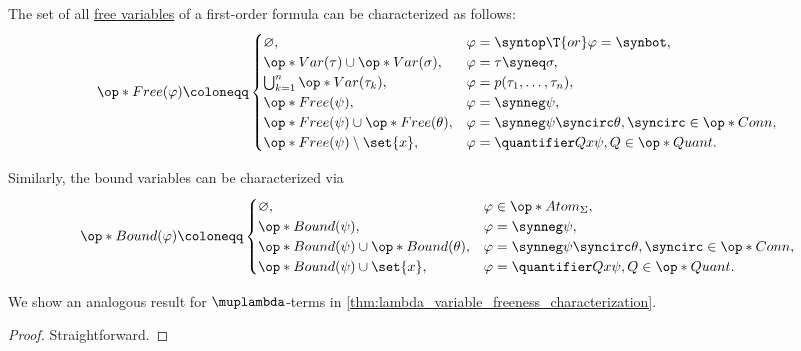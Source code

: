 \begin{proposition}\label{thm:fol_variable_freeness_characterization}
  The set of all \hyperref[def:fol_variable_freeness]{free variables} of a first-order formula can be characterized as follows:
  \begin{equation*}
    \op*{Free}(\varphi) \coloneqq \begin{cases}
      \varnothing,                                &\varphi = \syntop \T{or} \varphi = \synbot, \\
      \op*{Var}(\tau) \cup \op*{Var}(\sigma),     &\varphi = \tau \syneq \sigma, \\
      \bigcup_{k=1}^n \op*{Var}(\tau_k),          &\varphi = p(\tau_1, \ldots, \tau_n), \\
      \op*{Free}(\psi),                           &\varphi = \synneg \psi, \\
      \op*{Free}(\psi) \cup \op*{Free}(\theta),   &\varphi = \synneg \psi \syncirc \theta, {\syncirc} \in \op*{Conn}, \\
      \op*{Free}(\psi) \setminus \set{ x },       &\varphi = \quantifier Q x \psi, Q \in \op*{Quant}.
    \end{cases}
  \end{equation*}

  Similarly, the bound variables can be characterized via
  \begin{equation*}
    \op*{Bound}(\varphi) \coloneqq \begin{cases}
      \varnothing,                                &\varphi \in \op*{Atom}_\Sigma, \\
      \op*{Bound}(\psi),                          &\varphi = \synneg \psi, \\
      \op*{Bound}(\psi) \cup \op*{Bound}(\theta), &\varphi = \synneg \psi \syncirc \theta, {\syncirc} \in \op*{Conn}, \\
      \op*{Bound}(\psi) \cup \set{ x },           &\varphi = \quantifier Q x \psi, Q \in \op*{Quant}.
    \end{cases}
  \end{equation*}
\end{proposition}
\begin{comments}
  \item We show an analogous result for \( \muplambda \)-terms in \cref{thm:lambda_variable_freeness_characterization}.
\end{comments}
\begin{proof}
  Straightforward.
\end{proof}

